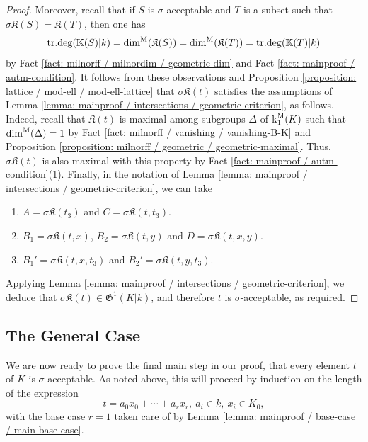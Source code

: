 \documentclass[11pt]{amsart}
\theoremstyle{definition}
\theoremstyle{remark}
\numberwithin{equation}{section}
\DeclareMathOperator{\trdeg}{tr.deg}
\newcommand{\Kbb}{\mathbb{K}}
\newcommand{\Kfrak}{\mathfrak{K}}
\newcommand{\Gfrak}{\mathfrak{G}}
\renewcommand{\k}{\operatorname{k}^{\rm M}}
\newcommand{\dimm}{\dim^{\rm M}}
\begin{document}
\begin{proof}
  Moreover, recall that if $S$ is $\sigma$-acceptable and $T$ is a subset such that $\sigma\Kfrak(S) = \Kfrak(T)$, then one has 
  \[ \trdeg(\Kbb(S)|k) = \dimm(\Kfrak(S)) = \dimm(\Kfrak(T)) = \trdeg(\Kbb(T)|k) \]
  by Fact \ref{fact: milnorff / milnordim / geometric-dim} and Fact \ref{fact: mainproof / autm-condition}.
  It follows from these observations and Proposition \ref{proposition: lattice / mod-ell / mod-ell-lattice} that $\sigma\Kfrak(t)$ satisfies the assumptions of Lemma \ref{lemma: mainproof / intersections / geometric-criterion}, as follows.
  Indeed, recall that $\Kfrak(t)$ is maximal among subgroups $\Delta$ of $\k_1(K)$ such that $\dimm(\Delta) = 1$ by Fact \ref{fact: milnorff / vanishing / vanishing-B-K} and Proposition \ref{proposition: milnorff / geometric / geometric-maximal}.
  Thus, $\sigma\Kfrak(t)$ is also maximal with this property by Fact \ref{fact: mainproof / autm-condition}(1).
  Finally, in the notation of Lemma \ref{lemma: mainproof / intersections / geometric-criterion}, we can take
  \begin{enumerate}
    \item $A = \sigma\Kfrak(t_3)$ and $C = \sigma\Kfrak(t,t_3)$.
    \item $B_1 = \sigma\Kfrak(t,x)$, $B_2 = \sigma\Kfrak(t,y)$ and $D = \sigma\Kfrak(t,x,y)$.
    \item $B_1' = \sigma\Kfrak(t,x,t_3)$ and $B_2' = \sigma\Kfrak(t,y,t_3)$.
  \end{enumerate}
  Applying Lemma \ref{lemma: mainproof / intersections / geometric-criterion}, we deduce that $\sigma\Kfrak(t) \in \Gfrak^1(K|k)$, and therefore $t$ is $\sigma$-acceptable, as required.
\end{proof}

\subsection{The General Case}
\label{subsection: mainproof / general-case}

We are now ready to prove the final main step in our proof, that every element $t$ of $K$ is $\sigma$-acceptable.
As noted above, this will proceed by induction on the length of the expression
\[ t = a_0 x_0 + \cdots + a_r x_r, \ a_i \in k, \ x_i \in K_0, \]
with the base case $r = 1$ taken care of by Lemma \ref{lemma: mainproof / base-case / main-base-case}.
\end{document}

